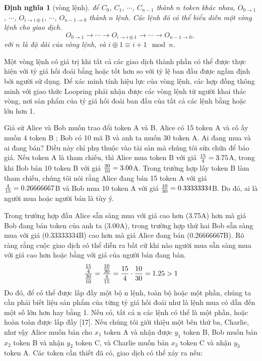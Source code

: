 \documentclass[12pt,a4paper]{article}
\newtheorem{definition}{Định nghĩa}[section]
\begin{document}
\begin{multicols}{2}
\begin{definition}[vòng lệnh] để $C_{0}$, $C_{1}$, $\cdots$, $C_{n-1}$ thành  $n$  token khác nhau,   $O_{0\rightarrow 1}$, $\cdots$, $O_{i\rightarrow i\oplus 1}$, $\cdots$, $O_{n-1 \rightarrow 0}$ thành $n$ lệnh.  Các lệnh đó có thể biểu diễn một vòng lệnh cho giao dịch.
$$O_{0\rightarrow 1} \rightarrow \cdots \rightarrow O_{i\rightarrow i\oplus 1} \rightarrow \cdots \rightarrow O_{n-1\rightarrow 0} \text{, }$$
với $n$ là độ dài của vòng lệnh, và $i\oplus 1 \equiv i+1 \mod n$.
\end{definition}

Một vòng lệnh có giá trị khi tất cả các giao dịch thành phần có thể được thực hiện với tỷ giá hối đoái bằng hoặc tốt hơn so với tỷ lệ ban đầu được ngầm định bởi người sử dụng. Để xác minh tính hiệu lực của vòng lệnh, các hợp đồng thông minh với giao thức Loopring phải nhận được các vòng lệnh từ người khai thác vòng, nơi sản phẩm của tỷ giá hối đoái ban đầu của tất cả các lệnh bằng hoặc lớn hơn 1.

Giả sử Alice và Bob muốn trao đổi token  A và B. Alice có 15 token  A và cô ấy muốn 4 token B ; Bob có 10 mã B và anh ta muốn 30 token A.
Ai đang mua và ai đang bán? Điều này chỉ phụ thuộc vào tài sản mà chúng tôi sửa chữa để báo giá. Nếu token A là tham chiếu, thì Alice mua token B với giá ${15 \over 4} = 3.75$A, trong khi Bob bán 10 token B với giá ${30 \over 10} = 3.00$A. Trong trường hợp lấy token B làm tham chiếu, chúng tôi nói rằng Alice đang bán 15 token A với giá ${4\over 15}=0.26666667$B và Bob mua 10 token A với giá ${10 \over 30}=0.33333334$B. Do đó, ai là người mua hoặc người bán là tùy ý.

Trong trường hợp đầu Alice sẵn sàng mua với giá cao hơn (3.75A) hơn mà giá Bob đang bán token của anh ta (3.00A), trong trường hợp thứ hai Bob sẵn sàng mua với giá (0.33333334B) cao hơn mà giá Alice đang bán (0.26666667B).  Rõ ràng rằng cuộc giao dịch có thể diễn ra bất cứ khi nào người mua sẵn sàng mua với giá cao hơn hoặc bằng với giá của người bán đang bán.
\begin{equation}
{{15\over 4} \over {30\over 10}} = {{10\over 30} \over {4\over 15}}={15 \over 4} \cdot {10 \over 30} = 1.25 > 1
\end{equation}
Do đó, để có thể được lấp đầy một bộ n lệnh, toàn bộ hoặc một phần, chúng ta cần phải biết liệu sản phẩm của từng tỷ giá hối đoái như là lệnh mua có dẫn đến một số lớn hơn hay bằng 1. Nếu có, tất cả n các lệnh có thể là một phần, hoặc hoàn toàn được lấp đầy [17].
Nếu chúng tôi giới thiệu một bên thứ ba, Charlie, như vậy Alice muốn bán cho $x_1$ token A và nhận được $y_1$ token B, Bob muốn bán $x_2$ token B và nhận $y_2$ token C, và Charlie muốn bán $x_3$ token C và nhận $y_3$ token A. Các token cần thiết đã có, giao dịch có thể xảy ra nếu:


\end{multicols}
\end{document}
